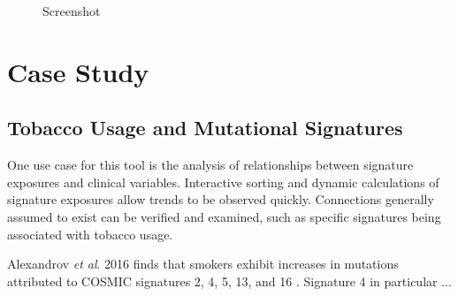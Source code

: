 \documentclass[12pt, letterpaper]{article}
\begin{document}
\begin{figure}
    \caption{Screenshot}
    \centering
\end{figure}


\section{Case Study}

\subsection{Tobacco Usage and Mutational Signatures}
One use case for this tool is the analysis of relationships between signature exposures and clinical variables.
Interactive sorting and dynamic calculations of signature exposures allow trends to be observed quickly.
Connections generally assumed to exist can be verified and examined, such as specific signatures being associated with tobacco usage.

Alexandrov \textit{et al}. 2016 finds that smokers exhibit increases in mutations attributed to COSMIC signatures 2, 4, 5, 13, and 16 \cite{alexandrov2016mutational}. 
Signature 4 in particular ...
\end{document}
